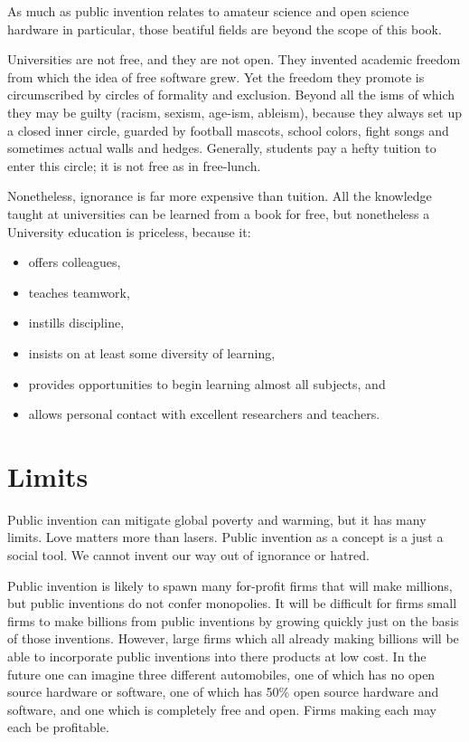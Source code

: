 \documentclass[
	fontsize=10pt, %
	twoside=false, %
	secnumdepth=1, %
]{kaobook}
\begin{document}
As much as public invention relates to amateur science and
open science hardware in particular, those beatiful fields
are beyond the scope of this book.

Universities are not free, and they are not open.
They invented academic freedom from which the idea of free software grew.
Yet the freedom they promote is circumscribed by circles of formality
and exclusion.
Beyond all the isms of which they may be guilty (racism, sexism, age-ism,
ableism), because they always set up a closed inner circle,
guarded by football mascots, school colors, fight songs and sometimes
actual walls and hedges.
Generally, students pay a hefty tuition to enter this circle;
it is not free as in free-lunch.


Nonetheless, ignorance is far more expensive than tuition.
All the knowledge taught at universities can be learned from
a book for free, but nonetheless a University education is priceless, because
it:
\begin{itemize}
  \item offers colleagues,
\item teaches teamwork,
\item instills discipline,
\item insists on at least some diversity  of learning,
\item provides opportunities to begin learning almost all subjects, and
  \item allows personal contact with excellent researchers and teachers.
  \end{itemize}



\chapter{Limits}

Public invention can mitigate global poverty and warming,
but it has many limits.
Love matters more than lasers.
Public invention as a concept is a just a social tool.
We cannot invent our way out of ignorance or hatred.

Public invention is likely to spawn many for-profit firms that will make millions,
but public inventions do not confer monopolies.
It will be difficult for firms small firms to make billions from public inventions
by growing quickly just on the basis of those inventions.
However, large firms which all already making billions will be able to incorporate
public inventions into there products at low cost. In the future one can imagine
three different automobiles, one of which has no open source hardware or software,
one of which has 50\% open source hardware and software, and one which is
completely free and open. Firms making each may each be profitable.
\end{document}
